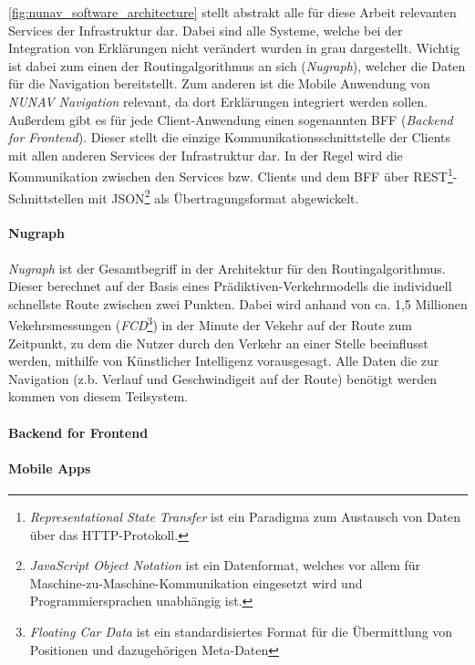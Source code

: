 \autoref{fig:nunav_software_architecture} stellt abstrakt alle für diese Arbeit relevanten Services der Infrastruktur dar. Dabei sind alle Systeme, welche bei der Integration von Erklärungen nicht verändert wurden in grau dargestellt. Wichtig ist dabei zum einen der Routingalgorithmus an sich (\textit{Nugraph}), welcher die Daten für die Navigation bereitstellt. Zum anderen ist die Mobile Anwendung von \textit{NUNAV Navigation} relevant, da dort Erklärungen integriert werden sollen. Außerdem gibt es für jede Client-Anwendung einen sogenannten BFF (\textit{Backend for Frontend}). Dieser stellt die einzige Kommunikationsschnittstelle der Clients mit allen anderen Services der Infrastruktur dar. In der Regel wird die Kommunikation zwischen den Services bzw. Clients und dem BFF über REST\footnote{\textit{Representational State Transfer} ist ein Paradigma zum Austausch von Daten über das HTTP-Protokoll.}-Schnittstellen mit JSON\footnote{\textit{JavaScript Object Notation} ist ein Datenformat, welches vor allem für Maschine-zu-Maschine-Kommunikation eingesetzt wird und Programmiersprachen unabhängig ist.} als Übertragungsformat abgewickelt. 

\paragraph{Nugraph} \textit{Nugraph} ist der Gesamtbegriff in der Architektur für den Routingalgorithmus. Dieser berechnet auf der Basis eines Prädiktiven-Verkehrmodells die individuell schnellste Route zwischen zwei Punkten. Dabei wird anhand von ca. 1,5 Millionen Vekehrsmessungen (\textit{FCD}\footnote{\textit{Floating Car Data} ist ein standardisiertes Format für die Übermittlung von Positionen und dazugehörigen Meta-Daten}) in der Minute der Vekehr auf der Route zum Zeitpunkt, zu dem die Nutzer durch den Verkehr an einer Stelle beeinflusst werden, mithilfe von Künstlicher Intelligenz vorausgesagt. Alle Daten die zur Navigation (z.b. Verlauf und Geschwindigeit auf der Route) benötigt werden kommen von diesem Teilsystem.

\paragraph{Backend for Frontend}

\paragraph{Mobile Apps}